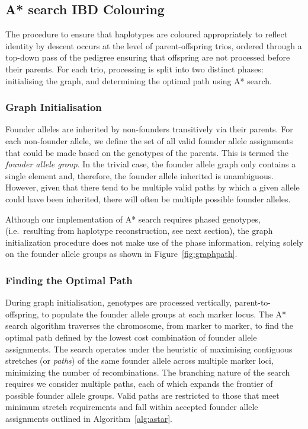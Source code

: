 \documentclass{assets/biotemplate/bioinfo}
\numberwithin{equation}{section}
\begin{document}
\begin{methods}
\subsection{A* search IBD Colouring}
\label{astarsearch}

The procedure to ensure that haplotypes are coloured appropriately to reflect identity by descent occurs at the level of parent-offspring trios, ordered through a top-down pass of the pedigree ensuring that offspring are not processed before their parents.
For each trio, processing is split into two distinct phases: initialising the graph, and determining the optimal path using A* search.


\subsubsection{Graph Initialisation}
\label{alg:initial}

Founder alleles are inherited by non-founders transitively via their parents. For each non-founder allele, we define the set of all valid founder allele assignments that could be made based on the genotypes of the parents. This is termed the {\it founder allele group}. In the trivial case, the founder allele graph only contains a single element and, therefore, the founder allele inherited is unambiguous. However, given that there tend to be multiple valid paths by which a given allele could have been inherited, there will often be multiple possible founder alleles.

Although our implementation of A* search requires phased genotypes, (i.e.~resulting from haplotype reconstruction, see next section), 
the graph initialization procedure does not make %
use of the phase information, relying solely on the founder allele groups as shown in Figure~\ref{fig:graphpath}. 

\subsubsection{Finding the Optimal Path}

During graph initialisation, genotypes are processed vertically, parent-to-offspring, to populate the founder allele groups at each marker locus. 
The A* search algorithm traverses the chromosome, from marker to marker, to find the optimal path defined by the lowest cost combination of founder allele assignments.
The search operates under the heuristic of maximising contiguous stretches (or \textit{paths}) of the same founder allele across multiple marker loci, minimizing the number of recombinations. The branching nature of the search requires we consider multiple paths, each of which expands the frontier of possible founder allele groups. Valid paths are restricted to those that meet minimum stretch requirements and fall within accepted founder allele assignments outlined in Algorithm~\ref{alg:astar}.


\end{methods}
\end{document}
